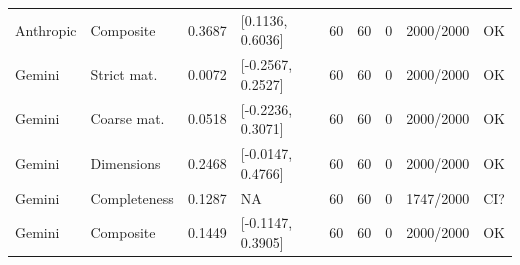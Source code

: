 \begin{table}[t]
{\begin{tabular}{lllllllll}
Anthropic & Composite & 0.3687 & [0.1136, 0.6036] & 60 & 60 & 0 & 2000/2000 & OK \\
Gemini & Strict mat. & 0.0072 & [-0.2567, 0.2527] & 60 & 60 & 0 & 2000/2000 & OK \\
Gemini & Coarse mat. & 0.0518 & [-0.2236, 0.3071] & 60 & 60 & 0 & 2000/2000 & OK \\
Gemini & Dimensions & 0.2468 & [-0.0147, 0.4766] & 60 & 60 & 0 & 2000/2000 & OK \\
Gemini & Completeness & 0.1287 & NA & 60 & 60 & 0 & 1747/2000 & CI? \\
Gemini & Composite & 0.1449 & [-0.1147, 0.3905] & 60 & 60 & 0 & 2000/2000 & OK \\
\bottomrule
\end{tabular}}
\end{table}

